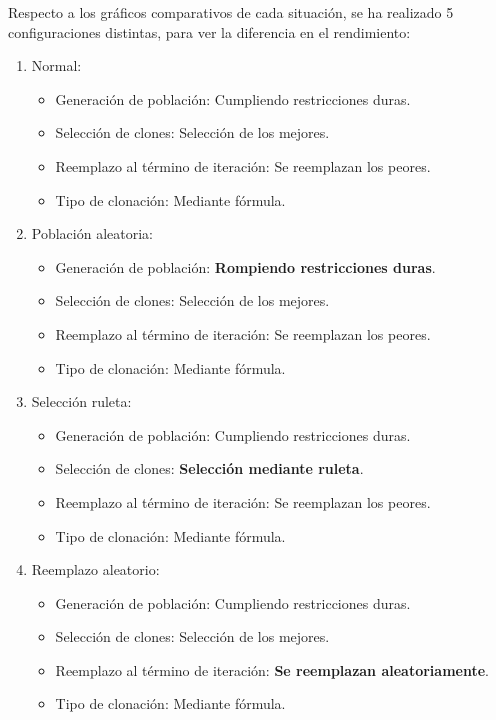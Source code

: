 Respecto a los gráficos comparativos de cada situación,
se ha realizado 5 configuraciones distintas, para ver la diferencia en el rendimiento:
\begin{enumerate}
    \item Normal:

        \begin{itemize}
            \item Generación de población: Cumpliendo restricciones duras.
            \item Selección de clones: Selección de los mejores.
            \item Reemplazo al término de iteración:  Se reemplazan los peores.
            \item Tipo de clonación: Mediante fórmula.
        \end{itemize}
    \item Población aleatoria:

        \begin{itemize}
            \item Generación de población: \textbf{Rompiendo restricciones duras}.
            \item Selección de clones: Selección de los mejores.
            \item Reemplazo al término de iteración:  Se reemplazan los peores.
            \item Tipo de clonación: Mediante fórmula.
        \end{itemize}

    \item Selección ruleta:

        \begin{itemize}
            \item Generación de población: Cumpliendo restricciones duras.
            \item Selección de clones: \textbf{Selección mediante ruleta}.
            \item Reemplazo al término de iteración:  Se reemplazan los peores.
            \item Tipo de clonación: Mediante fórmula.
        \end{itemize}

    \item Reemplazo aleatorio:

        \begin{itemize}
            \item Generación de población: Cumpliendo restricciones duras.
            \item Selección de clones: Selección de los mejores.
            \item Reemplazo al término de iteración:  \textbf{Se reemplazan aleatoriamente}.
            \item Tipo de clonación: Mediante fórmula.
        \end{itemize}


\end{enumerate}
